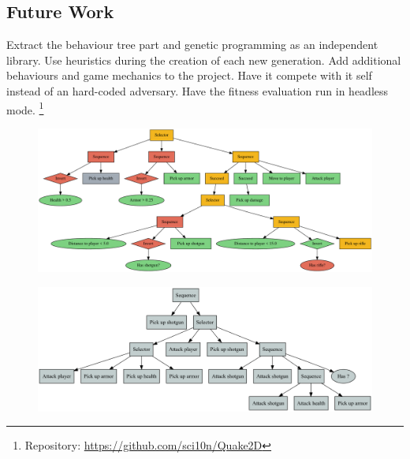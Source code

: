 \documentclass[a4paper, twocolumn]{article}
\begin{document}
    \subsection*{Future Work}

    Extract the behaviour tree part and genetic programming as an independent library. Use heuristics during the creation of each new generation. Add additional behaviours and game mechanics to the project. Have it compete with it self instead of an hard-coded adversary. Have the fitness evaluation run in headless mode. \footnote{Repository: \url{https://github.com/sci10n/Quake2D}}

    \clearpage

    \nocite{*} %
    
    

    \onecolumn
    \clearpage

    \appendix

    \thispagestyle{empty}

    \begin{figure}[H]
        \centering
        \includegraphics[angle=90,height=0.98\textheight]{share/hand_crafted_behaviour_tree.pdf}
    \end{figure}

    \clearpage

    \thispagestyle{empty}

    \begin{figure}[H]
        \centering
        \includegraphics[angle=90,height=0.98\textheight]{share/tree-fitness-3780.png}
    \end{figure}
\end{document}
